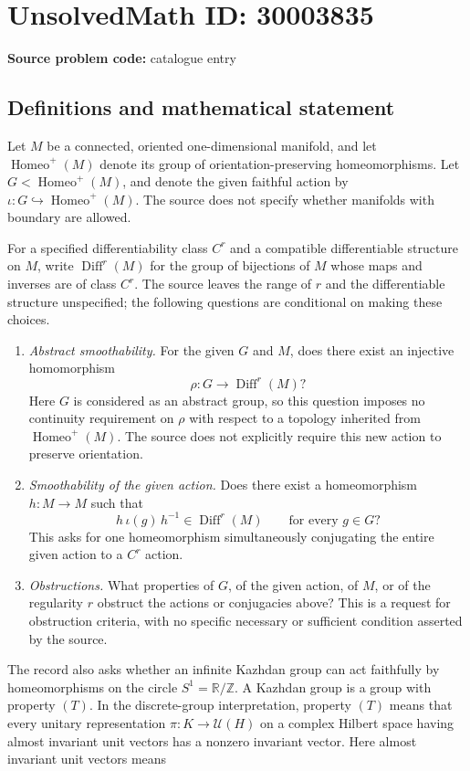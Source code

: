 \documentclass[11pt]{article}
\newcommand{\Z}{\mathbb{Z}}
\newcommand{\R}{\mathbb{R}}
\begin{document}
\section*{UnsolvedMath ID: 30003835}
\textbf{Source problem code:} catalogue entry
\subsection{Definitions and mathematical statement}
Let \(M\) be a connected, oriented one-dimensional manifold, and let \(\operatorname{Homeo}^{+}(M)\) denote its group of orientation-preserving homeomorphisms. Let \(G<\operatorname{Homeo}^{+}(M)\), and denote the given faithful action by \(\iota:G\hookrightarrow\operatorname{Homeo}^{+}(M)\). The source does not specify whether manifolds with boundary are allowed.\par
For a specified differentiability class \(C^r\) and a compatible differentiable structure on \(M\), write \(\operatorname{Diff}^{r}(M)\) for the group of bijections of \(M\) whose maps and inverses are of class \(C^r\). The source leaves the range of \(r\) and the differentiable structure unspecified; the following questions are conditional on making these choices.
\begin{enumerate}
\item \emph{Abstract smoothability.} For the given \(G\) and \(M\), does there exist an injective homomorphism
\[
\rho:G\longrightarrow\operatorname{Diff}^{r}(M)?
\]
Here \(G\) is considered as an abstract group, so this question imposes no continuity requirement on \(\rho\) with respect to a topology inherited from \(\operatorname{Homeo}^{+}(M)\). The source does not explicitly require this new action to preserve orientation.
\item \emph{Smoothability of the given action.} Does there exist a homeomorphism \(h:M\to M\) such that
\[
h\,\iota(g)\,h^{-1}\in\operatorname{Diff}^{r}(M)
\qquad\text{for every }g\in G?
\]
This asks for one homeomorphism simultaneously conjugating the entire given action to a \(C^r\) action.
\item \emph{Obstructions.} What properties of \(G\), of the given action, of \(M\), or of the regularity \(r\) obstruct the actions or conjugacies above? This is a request for obstruction criteria, with no specific necessary or sufficient condition asserted by the source.
\end{enumerate}
The record also asks whether an infinite Kazhdan group can act faithfully by homeomorphisms on the circle \(S^1=\R/\Z\). A Kazhdan group is a group with property \((T)\). In the discrete-group interpretation, property \((T)\) means that every unitary representation \(\pi:K\to\mathcal U(H)\) on a complex Hilbert space having almost invariant unit vectors has a nonzero invariant vector. Here almost invariant unit vectors means
\end{document}

